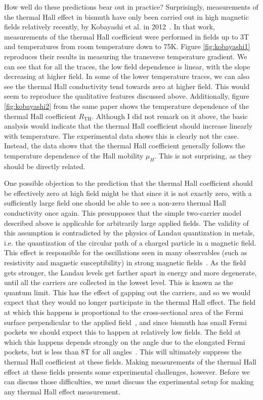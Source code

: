 \documentclass{thesis-umich}
\begin{document}
How well do these predictions bear out in practice? Surprisingly, measurements of the thermal Hall effect in bismuth have only been carried out in high magnetic fields relatively recently, by Kobayashi et al. in 2012~\cite{Kobayashi2012}. In that work, measurements of the thermal Hall coefficient were performed in fields up to 3T and temperatures from room temperature down to 75K. Figure \ref{fig:kobayashi1} reproduces their results in measuring the transverse temperature gradient. We can see that for all the traces, the low field dependence is linear, with the slope decreasing at higher field. In some of the lower temperature traces, we can also see the thermal Hall conductivity tend towards zero at higher field. This would seem to reproduce the qualitative features discussed above. Additionally, figure \ref{fig:kobayashi2} from the same paper shows the temperature dependence of the thermal Hall coefficient $R_{\mathrm{TH}}$. Although I did not remark on it above, the basic analysis would indicate that the thermal Hall coefficient should increase linearly with temperature. The experimental data shows this is clearly not the case. Instead, the data shows that the thermal Hall coefficient generally follows the temperature dependence of the Hall mobility $\mu_H$. This is not surprising, as they should be directly related.

One possible objection to the prediction that the thermal Hall coefficient should be effectively zero at high field might be that since it is not exactly zero, with a sufficiently large field one should be able to see a non-zero thermal Hall conductivity once again. This presupposes that the simple two-carrier model described above is applicable for arbitrarily large applied fields. The validity of this assumption is contradicted by the physics of Landau quantization in metals, i.e. the quantization of the circular path of a charged particle in a magnetic field. This effect is responsible for the oscillations seen in many observables (such as resistivity and magnetic susceptibility) in strong magnetic fields~\cite{Shoenberg}. As the field gets stronger, the Landau levels get farther apart in energy and more degenerate, until all the carriers are collected in the lowest level. This is known as the quantum limit. This has the effect of gapping out the carriers, and so we would expect that they would no longer participate in the thermal Hall effect. The field at which this happens is proportional to the cross-sectional area of the Fermi surface perpendicular to the applied field~\cite{Shoenberg}, and since bismuth has small Fermi pockets we should expect this to happen at relatively low fields. The field at which this happens depends strongly on the angle due to the elongated Fermi pockets, but is less than 8T for all angles~\cite{Li2008}. This will ultimately suppress the thermal Hall coefficient at these fields. Making measurements of the thermal Hall effect at these fields presents some experimental challenges, however. Before we can discuss those difficulties, we must discuss the experimental setup for making any thermal Hall effect measurement.  
\end{document}
